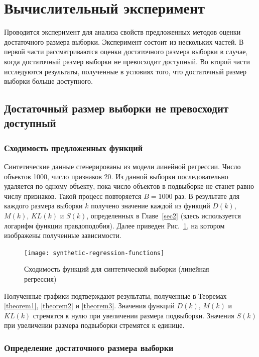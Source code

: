 \section{Вычислительный эксперимент}\label{sec4}

Проводится эксперимент для анализа свойств предложенных методов оценки достаточного размера выборки. Эксперимент состоит из нескольких частей. В первой части рассматриваются оценки достаточного размера выборки в случае, когда достаточный размер выборки не превосходит доступный. Во второй части исследуются результаты, полученные в условиях того, что достаточный размер выборки больше доступного.

\subsection{Достаточный размер выборки не превосходит доступный}

\subsubsection{Сходимость предложенных функций}

Синтетические данные сгенерированы из модели линейной регрессии. Число объектов 1000, число признаков 20. Из данной выборки последовательно удаляется по одному объекту, пока число объектов в подвыборке не станет равно числу признаков. Такой процесс повторяется $B=1000$ раз. В результате для каждого размера выборки $k$ получено значение каждой из функций $D(k)$, $M(k)$, $KL(k)$ и $S(k)$, определенных в Главе~\ref{sec2} (здесь используется логарифм функции правдоподобия). Далее приведен Рис.~\ref{synthetic-regression-functions}, на котором изображены полученные зависимости.

\begin{figure}[h!]
    \centering
    \texttt{[image: synthetic-regression-functions]}
    \caption{Сходимость функций для синтетической выборки (линейная регрессия)}
    \label{synthetic-regression-functions}
\end{figure}

Полученные графики подтверждают результаты, полученные в Теоремах \ref{theorem1}, \ref{theorem2} и \ref{theorem3}. Значения функций $D(k)$, $M(k)$ и $KL(k)$ стремятся к нулю при увеличении размера подвыборки. Значения $S(k)$ при увеличении размера подвыборки стремятся к единице.

\subsubsection{Определение достаточного размера выборки}

